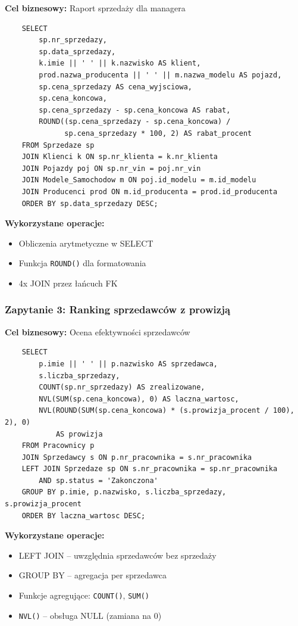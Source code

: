 \documentclass[a4paper,titleauthor]{mwart}
\begin{document}
	\textbf{Cel biznesowy:} Raport sprzedaży dla managera

	\begin{verbatim}
	SELECT 
		sp.nr_sprzedazy,
		sp.data_sprzedazy,
		k.imie || ' ' || k.nazwisko AS klient,
		prod.nazwa_producenta || ' ' || m.nazwa_modelu AS pojazd,
		sp.cena_sprzedazy AS cena_wyjsciowa,
		sp.cena_koncowa,
		sp.cena_sprzedazy - sp.cena_koncowa AS rabat,
		ROUND((sp.cena_sprzedazy - sp.cena_koncowa) / 
			  sp.cena_sprzedazy * 100, 2) AS rabat_procent
	FROM Sprzedaze sp
	JOIN Klienci k ON sp.nr_klienta = k.nr_klienta
	JOIN Pojazdy poj ON sp.nr_vin = poj.nr_vin
	JOIN Modele_Samochodow m ON poj.id_modelu = m.id_modelu
	JOIN Producenci prod ON m.id_producenta = prod.id_producenta
	ORDER BY sp.data_sprzedazy DESC;
	\end{verbatim}

	\textbf{Wykorzystane operacje:}
	\begin{itemize}
		\item Obliczenia arytmetyczne w SELECT
		\item Funkcja \texttt{ROUND()} dla formatowania
		\item 4x JOIN przez łańcuch FK
	\end{itemize}

	\subsubsection{Zapytanie 3: Ranking sprzedawców z prowizją}

	\textbf{Cel biznesowy:} Ocena efektywności sprzedawców

	\begin{verbatim}
	SELECT 
		p.imie || ' ' || p.nazwisko AS sprzedawca,
		s.liczba_sprzedazy,
		COUNT(sp.nr_sprzedazy) AS zrealizowane,
		NVL(SUM(sp.cena_koncowa), 0) AS laczna_wartosc,
		NVL(ROUND(SUM(sp.cena_koncowa) * (s.prowizja_procent / 100), 2), 0) 
			AS prowizja
	FROM Pracownicy p
	JOIN Sprzedawcy s ON p.nr_pracownika = s.nr_pracownika
	LEFT JOIN Sprzedaze sp ON s.nr_pracownika = sp.nr_pracownika 
		AND sp.status = 'Zakonczona'
	GROUP BY p.imie, p.nazwisko, s.liczba_sprzedazy, s.prowizja_procent
	ORDER BY laczna_wartosc DESC;
	\end{verbatim}

	\textbf{Wykorzystane operacje:}
	\begin{itemize}
		\item LEFT JOIN -- uwzględnia sprzedawców bez sprzedaży
		\item GROUP BY -- agregacja per sprzedawca
		\item Funkcje agregujące: \texttt{COUNT()}, \texttt{SUM()}
		\item \texttt{NVL()} -- obsługa NULL (zamiana na 0)
	\end{itemize}
\end{document}
